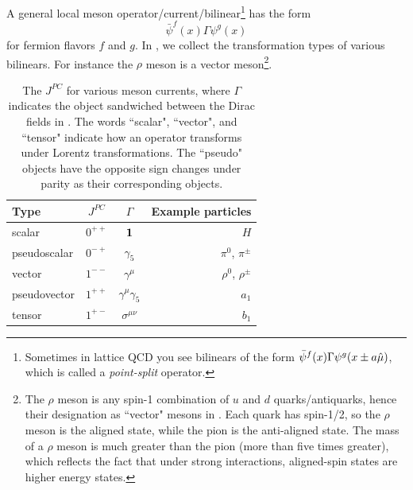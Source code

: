 A general local meson operator/current/bilinear\footnote{Sometimes in lattice
QCD you see bilinears of the form $\bar{\psi}^f(x)\Gamma\psi^g(x\pm a\hat{\mu})$,
which is called a {\it point-split} operator.} has the form
\begin{equation}\label{eq:mesonInterpLat}
  \bar{\psi}^f(x)\Gamma\psi^g(x)
\end{equation}
for fermion flavors $f$ and $g$. In , we collect the
transformation types of various bilinears.
For instance the $\rho$ meson is a vector meson\footnote{The $\rho$ meson is any 
spin-1 combination of $u$ and $d$
quarks/antiquarks, hence their designation as ``vector" mesons in
. Each quark has spin-1/2, so the $\rho$ meson is the
aligned state, while the pion is the anti-aligned state. The mass of a
$\rho$ meson is much greater than the pion (more than five times greater), which
reflects the fact that under strong interactions, aligned-spin states are higher
energy states.}.


\begin{table}
\begin{tabularx}{\linewidth}{LCCr} \hline\hline
Type         & $J^{PC}$ & $\Gamma$ & Example particles \\\hline
scalar       & $0^{++}$ & ${\mathbf 1}$                 &  $H$\\
pseudoscalar & $0^{-+}$ & $\gamma_5$            &  $\pi^0$, $\pi^{\pm}$\\ 
vector       & $1^{--}$ & $\gamma^\mu$          &  $\rho^0$, $\rho^{\pm}$\\ 
pseudovector & $1^{++}$ & $\gamma^\mu\gamma_5$  &  $a_1$\\ 
tensor       & $1^{+-}$ & $\sigma^{\mu\nu}$     &  $b_1$\\ 
\hline\hline
\end{tabularx}
\caption{The $J^{PC}$ for various meson currents, where $\Gamma$ indicates the
object sandwiched between the Dirac fields in .
The words ``scalar", ``vector", and ``tensor" indicate how an operator
transforms under Lorentz transformations. The ``pseudo" objects have the
opposite sign changes under parity as their corresponding objects.}
\label{tab:discreteSymm}
\end{table}




